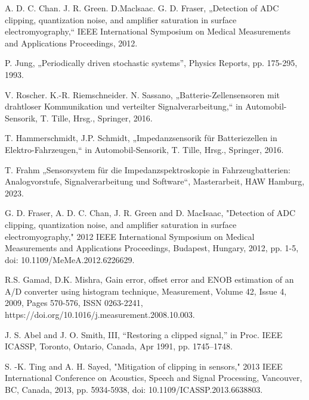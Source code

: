 \begin{thebibliography}{[99]}
	A. D. C. Chan. J. R. Green. D.Maclsaac. G. D. Fraser, „Detection of ADC clipping, quantization noise, and amplifier saturation in surface electromyography,“ IEEE International Symposium on Medical Measurements and Applications Proceedings, 2012.
	
	P. Jung, „Periodically driven stochastic systems”, Physics Reports,  pp. 175-295, 1993.
	
	V. Roscher. K.-R. Riemschneider. N. Sassano, „Batterie-Zellensensoren mit drahtloser Kommunikation und verteilter Signalverarbeitung,“ in Automobil-Sensorik, T. Tille, Hrsg., Springer, 2016.
	
	T. Hammerschmidt, J.P. Schmidt, „Impedanzsensorik für Batteriezellen in Elektro-Fahrzeugen,“ in Automobil-Sensorik, T. Tille, Hrsg., Springer, 2016.
	
	T. Frahm „Sensorsystem für die Impedanzspektroskopie in Fahrzeugbatterien: Analogvorstufe, Signalverarbeitung und Software“, Masterarbeit, HAW Hamburg, 2023.
	
	G. D. Fraser, A. D. C. Chan, J. R. Green and D. MacIsaac, "Detection of ADC clipping, quantization noise, and amplifier saturation in surface electromyography," 2012 IEEE International Symposium on Medical Measurements and Applications Proceedings, Budapest, Hungary, 2012, pp. 1-5, doi: 10.1109/MeMeA.2012.6226629.
	
	R.S. Gamad, D.K. Mishra,
	Gain error, offset error and ENOB estimation of an A/D converter using histogram technique,
	Measurement,
	Volume 42, Issue 4,
	2009,
	Pages 570-576,
	ISSN 0263-2241,
	https://doi.org/10.1016/j.measurement.2008.10.003.
	
	J. S. Abel and J. O. Smith, III, “Restoring a clipped signal,” in
	Proc. IEEE ICASSP, Toronto, Ontario, Canada, Apr 1991, pp.
	1745–1748.	

	S. -K. Ting and A. H. Sayed, "Mitigation of clipping in sensors," 2013 IEEE International Conference on Acoustics, Speech and Signal Processing, Vancouver, BC, Canada, 2013, pp. 5934-5938, doi: 10.1109/ICASSP.2013.6638803.


	
\end{thebibliography}
	

 
 